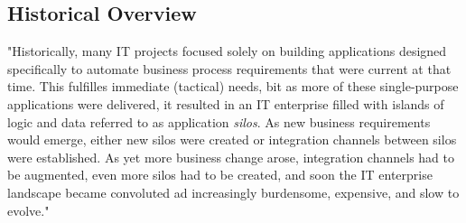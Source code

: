 \documentclass[12pt]{article}
\begin{document}
\subsection{Historical Overview}
"Historically, many IT projects focused solely on building applications designed specifically to automate business process requirements that were current at that time. This fulfilles immediate (tactical) needs, bit as more of these single-purpose applications were delivered, it resulted in an IT enterprise filled with islands of logic and data referred to as application \textit{silos}. As new business requirements would emerge, either new silos were created or integration channels between silos were established. As yet more business change arose, integration channels had to be augmented, even more silos had to be created, and soon the IT enterprise landscape became convoluted ad increasingly burdensome, expensive, and slow to evolve."\cite[page 522]{grau} 
\end{document}
